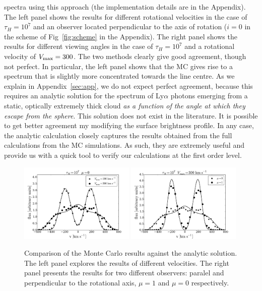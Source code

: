 spectra using this approach (the implementation details are in the Appendix).
The left panel shows the results for different rotational velocities
in the case of $\tau_{H}=10^7$ and an observer located perpendicular
to the axis of rotation ($i=0$ in the scheme of Fig~\ref{fig:scheme}
in the Appendix). The right panel shows the results for different viewing angles in the
case of $\tau_{H}=10^7$ and a rotational velocity of $V_{\rm
max}=300$\kms.
The two methods clearly give good agreement, though not perfect. In particular, the left panel shows that the MC gives rise to a spectrum that is
slightly more concentrated towards the line centre. As we explain in Appendix~\ref{sec:app}, we do not expect perfect agreement, because this requires an analytic solution for the spectrum of Ly$\alpha$ photons emerging from a static, optically extremely thick cloud {\it as a function of the angle at which they escape from the sphere}. This solution does not exist in the literature. It is possible to get better agreement my modifying the surface brightness profile.
In any case, the analytic calculation closely captures the results
obtained from the full calculations from the MC simulations.
As such, they are extremely useful and provide us with a quick tool to
verify our calculations at the first order level.
\begin{figure}
\begin{center}
\includegraphics[width=0.49\textwidth]{../Figures/fig10a.pdf}
\includegraphics[width=0.49\textwidth]{../Figures/fig10b.pdf}
\end{center}
\caption{
Comparison of the Monte Carlo results against the analytic
solution. The left panel explores the results of different velocities.
The right panel presents the results for two different observers:
paralel and perpendicular to the rotational axis, $\mu=1$ and $\mu=0$
respectively.
\label{fig:comparison} }
\end{figure}
